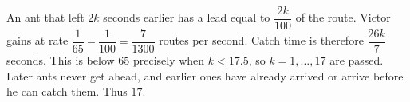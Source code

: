 An ant that left $2k$ seconds earlier has a lead equal to $\dfrac{2k}{100}$ of the route. Victor gains at rate $\dfrac{1}{65}-\dfrac{1}{100}=\dfrac{7}{1300}$ routes per second. Catch time is therefore $\dfrac{26k}{7}$ seconds. This is below $65$ precisely when $k<17.5$, so $k=1,\ldots,17$ are passed. Later ants never get ahead, and earlier ones have already arrived or arrive before he can catch them. Thus $\boxed{17}$.
